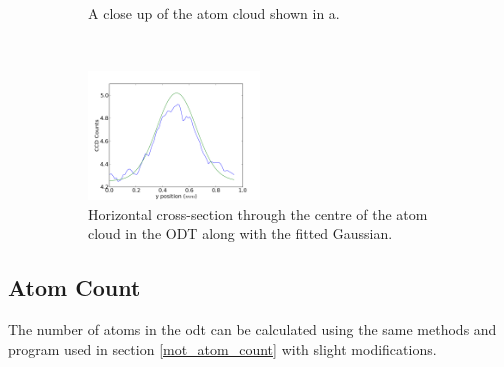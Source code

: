 \begin{figure}[h]
    \begin{subfigure}[b]{0.5\textwidth}\centering
\caption{A close up of the atom cloud shown in a.}
    \end{subfigure}~~~\begin{subfigure}[b]{0.5\textwidth}
        \centering
        \includegraphics[width=0.5\textwidth]{figs/ODTimage1y.png}
        \caption{Horizontal cross-section through the centre of the atom cloud in the ODT along with the fitted Gaussian.}
    \end{subfigure}

    \caption{}
    \label{fig:ODTimage1}
\end{figure}


\subsection{Atom Count}
The number of atoms in the \gls{odt} can be calculated using the same methods and program used in section \ref{mot_atom_count} with slight modifications.

